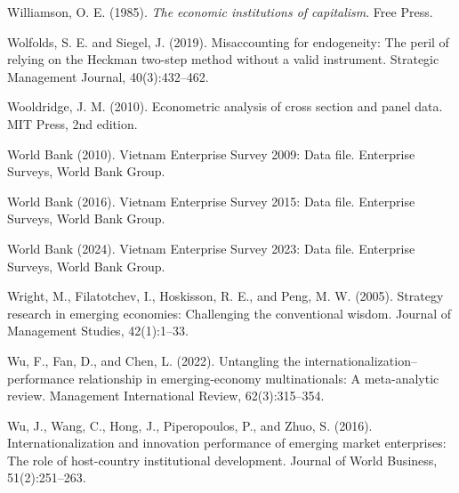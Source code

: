 \documentclass[12pt,a4paper]{article}
\begin{document}
Williamson, O. E. (1985). \emph{The economic institutions of
capitalism}. Free Press.

Wolfolds, S. E. and Siegel, J. (2019). Misaccounting for endogeneity:
The peril of relying on the Heckman two-step method without a valid
instrument. Strategic Management Journal, 40(3):432--462.

Wooldridge, J. M. (2010). Econometric analysis of cross section and
panel data. MIT Press, 2nd edition.

World Bank (2010). Vietnam Enterprise Survey 2009: Data file. Enterprise
Surveys, World Bank Group.

World Bank (2016). Vietnam Enterprise Survey 2015: Data file. Enterprise
Surveys, World Bank Group.

World Bank (2024). Vietnam Enterprise Survey 2023: Data file. Enterprise
Surveys, World Bank Group.

Wright, M., Filatotchev, I., Hoskisson, R. E., and Peng, M. W. (2005).
Strategy research in emerging economies: Challenging the conventional
wisdom. Journal of Management Studies, 42(1):1--33.

Wu, F., Fan, D., and Chen, L. (2022). Untangling the
internationalization--performance relationship in emerging-economy
multinationals: A meta-analytic review. Management International Review,
62(3):315--354.

Wu, J., Wang, C., Hong, J., Piperopoulos, P., and Zhuo, S. (2016).
Internationalization and innovation performance of emerging market
enterprises: The role of host-country institutional development. Journal
of World Business, 51(2):251--263.
\end{document}
